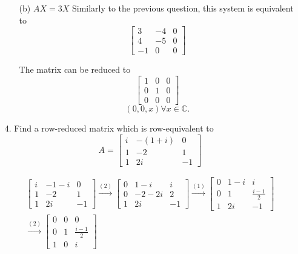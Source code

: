 \documentclass{article}
\begin{document}
\begin{enumerate}[listparindent=\parindent]
\begin{enumerate}
\item[(b)] \(AX = 3X\)
    Similarly to the previous question, this system is equivalent to
    \[
        \begin{bmatrix}
            3 & -4 & 0 \\
            4 & -5 & 0 \\
            -1 & 0 & 0
        \end{bmatrix}
    \]

    The matrix can be reduced to
    \[
        \begin{bmatrix}
            1 & 0 & 0 \\
            0 & 1 & 0 \\
            0 & 0 & 0
        \end{bmatrix}
    \]
    \[ \boxed {
        (0, 0, x) \forall x \in \mathbb C.
    } \]
\end{enumerate}

\item[4.] Find a row-reduced matrix which is row-equivalent to
    \[
        A = \begin{bmatrix}
            i & -(1 + i) & 0 \\
            1 & -2 & 1 \\
            1 & 2i & -1
        \end{bmatrix}
    \]

\begin{gather*}
    \begin{bmatrix}
        i & -1 - i & 0 \\
        1 & -2 & 1 \\
        1 & 2i & -1
    \end{bmatrix}
    \xrightarrow{(2)}
    \begin{bmatrix}
        0 & 1 - i & i \\
        0 & -2-2i & 2 \\
        1 & 2i & -1
    \end{bmatrix}
    \xrightarrow{(1)}
    \begin{bmatrix}
        0 & 1 - i & i \\
        0 & 1 & \frac{i - 1}{2} \\
        1 & 2i & -1
    \end{bmatrix}
    \\
    \xrightarrow{(2)}
    \boxed{
        \begin{bmatrix}
            0 & 0 & 0 \\
            0 & 1 & \frac{i - 1}{2} \\
            1 & 0 & i
        \end{bmatrix}
    }
\end{gather*}


\end{enumerate}
\end{document}
